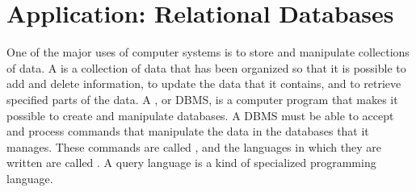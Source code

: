 \section{Application: Relational Databases}\label{S-sets-8}

One of the major uses of computer systems is to store and manipulate
collections of data.  A  is a collection of data
that has been organized so that it is possible to add and delete
information, to update the data that it contains, and to
retrieve specified parts of the data.  A , or DBMS, is a computer program that makes it possible
to create and manipulate databases.  A DBMS must be able to
accept and process commands that manipulate the data in the databases
that it manages.  These commands are called ,
and the languages in which they are written are called 
.  A query language is
a kind of specialized programming language.


